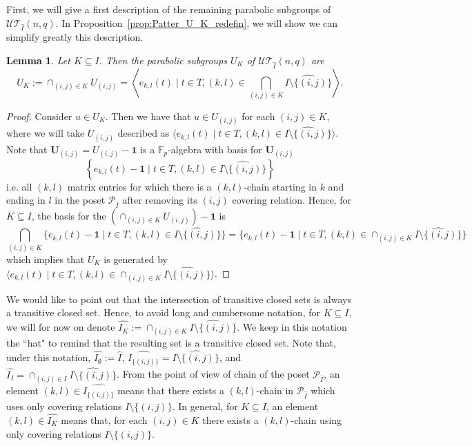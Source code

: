\documentclass[11pt,letterpaper]{amsart}
\newtheorem{lemma}[theorem]{Lemma}
\newcommand{\TT}{\mathcal{T}}
\newcommand{\PP}{\mathcal{P}}
\newcommand{\FF}{\mathbb{F}}
\newcommand{\UU}{\mathcal{U}}
\begin{document}
First, we will give a first description of the remaining parabolic subgroups of $\UU\TT_{\widehat{I}}(n,q)$. In Proposition~\ref{prop:Patter_U_K_redefin}, we will show we can simplify greatly this description.

\begin{lemma}\label{lem:patter_U_K}
    Let $K\subseteq I$. Then the parabolic subgroups $U_K$ of $\UU\TT_{\widehat{I}}(n,q)$ are $$U_K := \cap_{(i,j)\in K} U_{(i,j)} = \left\langle e_{k,l}(t)\mid t\in T, (k,l)\in\bigcap_{(i,j)\in K} \widehat{I\setminus\{(i,j)\}}\right\rangle.$$
\end{lemma}
\begin{proof}
    Consider $u\in U_{K}$. Then we have that $u\in U_{(i,j)}$ for each $(i,j)\in K$, where we will take $U_{(i,j)}$ described as $\langle e_{k,l}(t)\mid t\in T, (k,l)\in \widehat{I\setminus\{(i,j)\}}\rangle$.
    Note that $\mathbf{U}_{(i,j)}=U_{(i,j)}-\mathbf{1}$ is a $\FF_p$-algebra with basis for $\mathbf{U}_{(i,j)}$
    $$\left\{e_{k,l}(t)-\mathbf{1}\mid t\in T,(k,l) \in\widehat{I\setminus\{(i,j)\}}\right\}$$
    i.e. all $(k,l)$ matrix entries for which there is a $(k,l)$-chain starting in $k$ and ending in $l$ in the poset $\PP_{\widehat{I}}$ after removing its $(i,j)$ covering relation.
    Hence, for $K\subseteq I$, the basis for the $(\cap_{(i,j)\in K} U_{(i,j)})-\mathbf{1}$ is
    $$\bigcap_{(i,j)\in K}\{e_{k,l}(t)-\mathbf{1}\mid t\in T,(k,l) \in\widehat{I\setminus\{(i,j)\}}\} = \{e_{k,l}(t)-\mathbf{1}\mid t\in T,(k,l) \in \cap_{(i,j)\in K}\widehat{I\setminus\{(i,j)\}}\}$$
    which implies that $U_K$ is generated by 
    $\langle e_{k,l}(t)\mid t\in T, (k,l)\in\cap_{(i,j)\in K}\widehat{I\setminus\{(i,j)\}}\rangle$.
\end{proof}

We would like to point out that the intersection of transitive closed sets is always a transitive closed set.
Hence, to avoid long and cumbersome notation, for $K\subseteq I$, we will for now on denote $\widehat{I_K} := \cap_{(i,j)\in K} \widehat{I\setminus\{(i,j)\}}$. We keep in this notation the ``hat" to remind that the resulting set is a transitive closed set.
Note that, under this notation, $\widehat{I_{\emptyset}} := \widehat{I}$, $\widehat{I_{\{(i,j)\}}} = \widehat{I\setminus\{(i,j)\}}$, and $\widehat{I_I} = \cap_{(i,j)\in I} \widehat{I\setminus\{(i,j)\}}$.
 From the point of view of chain of the poset $\PP_{\widehat{I}}$, an element $(k,l)\in \widehat{I_{\{(i,j)\}}}$ means that there exists a $(k,l)$-chain in $\PP_{\widehat{I}}$ which uses only covering relations $I\setminus\{(i,j)\}$. In general, for $K\subseteq I$, an element $(k,l)\in \widehat{I_{K}}$ means that, for each $(i,j)\in K$ there exists a $(k,l)$-chain using only covering relations $I\setminus\{(i,j)\}$.
 
\end{document}
